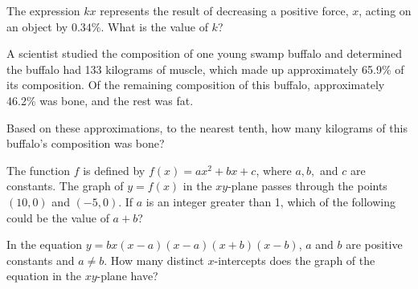 \vspace{0.75em}

\vspace{2em}
\noindent\markforreview

\vspace{1em}

The expression \( kx \) represents the result of decreasing a positive force, \( x \), acting on an object by \( 0.34\% \). What is the value of \( k \)?

\vspace{0.75em}

\newpage



\noindent\markforreview

\vspace{1em}

A scientist studied the composition of one young swamp buffalo and determined the buffalo had 133 kilograms of muscle, which made up approximately 65.9\% of its composition. Of the remaining composition of this buffalo, approximately 46.2\% was bone, and the rest was fat.  

Based on these approximations, to the nearest tenth, how many kilograms of this buffalo’s composition was bone?

\vspace{0.75em}
\vspace{2em}

\noindent\markforreview

\vspace{1em}

The function \( f \) is defined by \( f(x) = ax^2 + bx + c \), where \( a, b, \) and \( c \) are constants. The graph of \( y = f(x) \) in the \( xy \)-plane passes through the points \( (10, 0) \) and \( (-5, 0) \).  
If \( a \) is an integer greater than 1, which of the following could be the value of \( a + b \)?

\vspace{0.75em}


\vspace{1em}

\newpage
\noindent\markforreview

\vspace{1em}

In the equation \( y = bx(x - a)(x - a)(x + b)(x - b) \),  
\( a \) and \( b \) are positive constants and \( a \ne b \).  
How many distinct \( x \)-intercepts does the graph of the equation in the \( xy \)-plane have?

